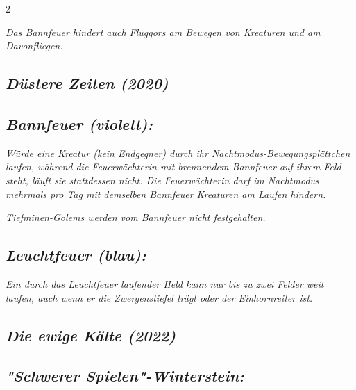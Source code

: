 \documentclass[10pt, a4paper, oneside]{book}
\newcommand{\fan}[1]{\textit{#1}}
\begin{document}
\begin{multicols*}{2}
\begin{bgcolor}[color-BB]
\fan{Das Bannfeuer hindert auch Fluggors am Bewegen von Kreaturen und am Davonfliegen.}






\end{bgcolor}







\begin{bgcolor}[color-DZ]
\section{\fan{Düstere Zeiten (2020)}}


\subsection{\fan{Bannfeuer (violett):}}

\fan{Würde eine Kreatur (kein Endgegner) durch ihr Nachtmodus-Bewegungsplättchen laufen, während die Feuerwächterin mit brennendem Bannfeuer auf ihrem Feld steht, läuft sie stattdessen nicht. Die Feuerwächterin darf im Nachtmodus mehrmals pro Tag mit demselben Bannfeuer Kreaturen am Laufen hindern.}

\fan{Tiefminen-Golems werden vom Bannfeuer nicht festgehalten.}


\subsection{\fan{Leuchtfeuer (blau):}}

\fan{Ein durch das Leuchtfeuer laufender Held kann nur bis zu zwei Felder weit laufen, auch wenn er die Zwergenstiefel trägt oder der Einhornreiter ist.}

\end{bgcolor}




\begin{bgcolor}
\section{\fan{Die ewige Kälte (2022)}}



\subsection{\fan{"Schwerer Spielen"-Winterstein:}}


\end{bgcolor}
\end{multicols*}
\end{document}
